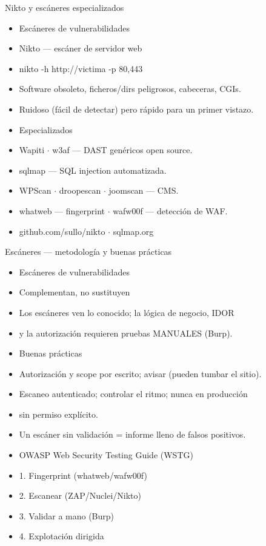 \documentclass[aspectratio=169,10pt]{beamer}
\begin{document}
\begin{frame}[allowframebreaks]{Nikto y escáneres especializados}
\small
  \begin{itemize}
  \item Escáneres de vulnerabilidades
  \item Nikto --- escáner de servidor web
  \item nikto -h http://victima -p 80,443
  \item Software obsoleto, ficheros/dirs peligrosos, cabeceras, CGIs.
  \item Ruidoso (fácil de detectar) pero rápido para un primer vistazo.
  \item Especializados
  \item Wapiti $\cdot$ w3af --- DAST genéricos open source.
  \item sqlmap --- SQL injection automatizada.
  \item WPScan $\cdot$ droopescan $\cdot$ joomscan --- CMS.
  \item whatweb --- fingerprint $\cdot$ wafw00f --- detección de WAF.
  \item github.com/sullo/nikto $\cdot$ sqlmap.org
  \end{itemize}
\end{frame}

\begin{frame}[allowframebreaks]{Escáneres --- metodología y buenas prácticas}
\small
  \begin{itemize}
  \item Escáneres de vulnerabilidades
  \item Complementan, no sustituyen
  \item Los escáneres ven lo conocido; la lógica de negocio, IDOR
  \item y la autorización requieren pruebas MANUALES (Burp).
  \item Buenas prácticas
  \item Autorización y scope por escrito; avisar (pueden tumbar el sitio).
  \item Escaneo autenticado; controlar el ritmo; nunca en producción
  \item sin permiso explícito.
  \item Un escáner sin validación = informe lleno de falsos positivos.
  \item OWASP Web Security Testing Guide (WSTG)
  \item 1. Fingerprint (whatweb/wafw00f)
  \item 2. Escanear (ZAP/Nuclei/Nikto)
  \item 3. Validar a mano (Burp)
  \item 4. Explotación dirigida
  \end{itemize}
\end{frame}
\end{document}
